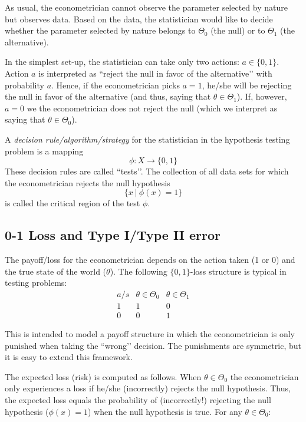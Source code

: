 \documentclass[11pt]{article} %
\begin{document}
As usual, the econometrician cannot observe the parameter selected by nature but observes data. Based on the data, the statistician would like to decide whether the parameter selected by nature belongs to $\Theta_0$ (the null) or to $\Theta_1$ (the alternative). 

In the simplest set-up, the statistician can take only two actions: $a \in \{0,1\}$. Action $a$ is interpreted as ``reject the null in favor of the alternative’’ with probability $a$. Hence, if the econometrician picks $a=1$, he/she will be rejecting the null in favor of the alternative (and thus, saying that $\theta \in \Theta_1$). If, however, $a=0$ we the econometrician does not reject the null (which we interpret as saying that $\theta \in \Theta_0$).  

A \emph{decision rule/algorithm/strategy} for the statistician in the hypothesis testing problem is a mapping
\begin{equation*}
\phi:X \rightarrow \{0,1\}
\end{equation*}
These decision rules are called ``tests’’. The collection of all data sets for which the econometrician rejects the null hypothesis 
$$\{x \: | \: \phi(x)=1\} $$
\noindent is called the critical region of the test $\phi$. \\


\subsection{0-1 Loss and Type I/Type II error}

The payoff/loss for the econometrician depends on the action taken (1 or 0) and the true state of the world ($\theta$). The following $\{0,1\}$-loss structure is typical in testing problems:
\begin{equation*}
\left.\begin{array}{ccc} a/s& \theta \in \Theta_0 & \theta \in \Theta_1 \\ 1 & 1 & 0 \\0 & 0 & 1\end{array}\right.
\end{equation*}

This is intended to model a payoff structure in which the econometrician is only punished when taking the ``wrong’’ decision. The punishments are symmetric, but it is easy to extend this framework. 

The expected loss (risk) is computed as follows. When $\theta \in \Theta_0$ the econometrician only experiences a loss if he/she (incorrectly) rejects the null hypothesis. Thus, the expected loss equals the probability of (incorrectly!) rejecting the null hypothesis ($\phi(x)=1$) when the null hypothesis is true. For any $\theta \in \Theta_0:$ 
\end{document}
